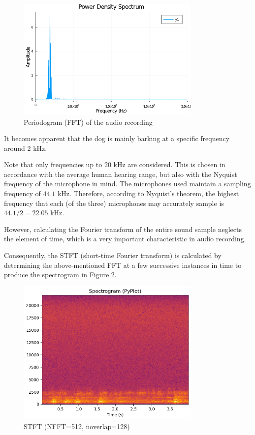 \documentclass[a4paper,12pt]{article}
\numberwithin{equation}{section}
\numberwithin{figure}{section}
\numberwithin{table}{section}
\begin{document}
\begin{figure}[h!]
    \centering %
    \includegraphics[padding=1ex,width=0.8\textwidth,frame]{img/fft_example.png}
    \caption{Periodogram (FFT) of the audio recording}
    \label{fft_example}
\end{figure}

It becomes apparent that the dog is mainly barking at a specific frequency around $2$ kHz.

Note that only frequencies up to $20$ kHz are considered. This is chosen in accordance with the average human hearing range, but also with the Nyquist frequency of the microphone in mind. The microphones used maintain a sampling frequency of $44.1$ kHz. Therefore, according to Nyquist's theorem, the highest frequency that each (of the three) microphones may accurately sample is $44.1/2=22.05$ kHz. %

However, calculating the Fourier transform of the entire sound sample neglects the element of time, which is a very important characteristic in audio recording.

Consequently, the STFT (short-time Fourier transform) is calculated by determining the above-mentioned FFT at a few successive instances in time to produce the spectrogram in Figure \ref{stft_example}.

\begin{figure}[h!]
    \centering %
    \includegraphics[padding=1ex,width=0.8\textwidth,frame]{img/stft_example.png}
    \caption{STFT (NFFT=512, noverlap=128)}
    \label{stft_example}
\end{figure}
\end{document}
